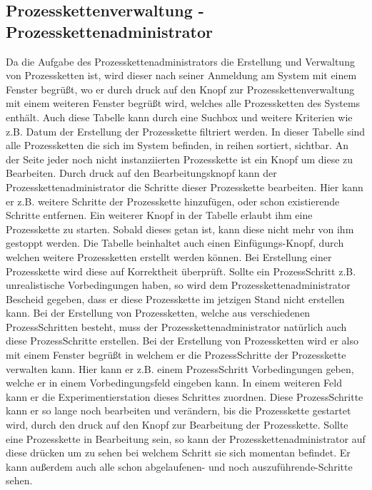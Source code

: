 \documentclass[enabledeprecatedfontcommands,fontsize=12pt,paper=a4,twoside]{scrartcl}
\begin{document}
\subsection{Prozesskettenverwaltung - Prozesskettenadministrator}

Da die Aufgabe des Prozesskettenadministrators die Erstellung und Verwaltung von Prozessketten ist, wird dieser nach seiner Anmeldung am System mit einem Fenster begrüßt, wo er durch druck auf den Knopf zur Prozesskettenverwaltung mit einem weiteren Fenster begrüßt wird, welches alle Prozessketten des Systems enthält.
Auch diese Tabelle kann durch eine Suchbox und weitere Kriterien wie z.B. Datum der Erstellung der Prozesskette filtriert werden.
In dieser Tabelle sind alle Prozessketten die sich im System befinden, in reihen sortiert, sichtbar. An der Seite jeder noch nicht instanziierten Prozesskette ist ein Knopf um diese zu Bearbeiten. Durch druck auf den Bearbeitungsknopf kann der Prozesskettenadministrator die Schritte dieser Prozesskette bearbeiten. Hier kann er z.B. weitere Schritte der Prozesskette hinzufügen, oder schon existierende Schritte entfernen.
Ein weiterer Knopf in der Tabelle erlaubt ihm eine Prozesskette zu starten. Sobald dieses getan ist, kann diese nicht mehr von ihm gestoppt werden.
Die Tabelle beinhaltet auch einen Einfügungs-Knopf, durch welchen weitere Prozessketten erstellt werden können.
Bei Erstellung einer Prozesskette wird diese auf Korrektheit überprüft. Sollte ein ProzessSchritt z.B. unrealistische Vorbedingungen haben, so wird dem Prozesskettenadministrator Bescheid gegeben, dass er diese Prozesskette im jetzigen Stand nicht erstellen kann.
Bei der Erstellung von Prozessketten, welche aus verschiedenen ProzessSchritten besteht, muss der Prozesskettenadministrator natürlich auch diese ProzessSchritte erstellen. Bei der Erstellung von Prozessketten wird er also mit einem Fenster begrüßt in welchem er die ProzessSchritte der Prozesskette verwalten kann.
Hier kann er z.B. einem ProzessSchritt Vorbedingungen geben, welche er in einem Vorbedingungsfeld eingeben kann. In einem weiteren Feld kann er die Experimentierstation dieses Schrittes zuordnen. Diese ProzessSchritte kann er so lange noch bearbeiten und verändern, bis die Prozesskette gestartet wird, durch den druck auf den Knopf zur Bearbeitung der Prozesskette.
Sollte eine Prozesskette in Bearbeitung sein, so kann der Prozesskettenadministrator auf diese drücken um zu sehen bei welchem Schritt sie sich momentan befindet. Er kann außerdem auch alle schon abgelaufenen- und noch auszuführende-Schritte sehen.
 
\end{document}
